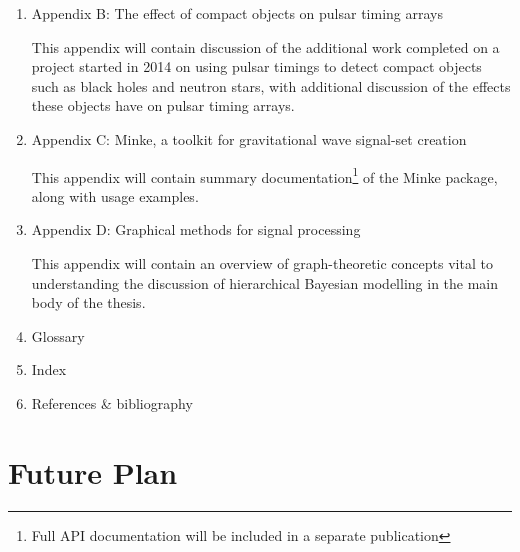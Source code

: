 \documentclass{kentigern}
\theoremstyle{definition}
\begin{document}
\begin{enumerate}
\begin{enumerate}
  \item Appendix B: The effect of compact objects on pulsar timing arrays

    This appendix will contain discussion of the additional work
    completed on a project started in 2014 on using pulsar timings to
    detect compact objects such as black holes and neutron stars, with
    additional discussion of the effects these objects have on pulsar
    timing arrays.
    
  \item Appendix C: Minke, a toolkit for gravitational wave signal-set creation

    This appendix will contain summary documentation\footnote{Full API
      documentation will be included in a separate publication} of the
    Minke package, along with usage examples.
    
  \item Appendix D: Graphical methods for signal processing

    This appendix will contain an overview of graph-theoretic concepts
    vital to understanding the discussion of hierarchical Bayesian
    modelling in the main body of the thesis.
    
  \item Glossary
  \item Index
  \item References \& bibliography
  \end{enumerate}
\end{enumerate}


\chapter{Future Plan}



\end{document}
